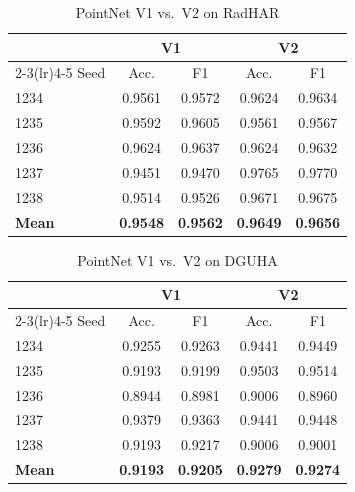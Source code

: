 \documentclass[10pt,twocolumn]{article}
\begin{document}
\begin{table}[H]
\centering
\scriptsize
\setlength{\tabcolsep}{3pt}
\begin{tabular}{lcccc}
\toprule
 & \multicolumn{2}{c}{V1} & \multicolumn{2}{c}{V2} \\
\cmidrule(lr){2-3}\cmidrule(lr){4-5}
Seed & Acc. & F1 & Acc. & F1 \\
\midrule
1234 & 0.9561 & 0.9572 & 0.9624 & 0.9634 \\
1235 & 0.9592 & 0.9605 & 0.9561 & 0.9567 \\
1236 & 0.9624 & 0.9637 & 0.9624 & 0.9632 \\
1237 & 0.9451 & 0.9470 & 0.9765 & 0.9770 \\
1238 & 0.9514 & 0.9526 & 0.9671 & 0.9675 \\
\midrule
\textbf{Mean} & \textbf{0.9548} & \textbf{0.9562} & \textbf{0.9649} & \textbf{0.9656} \\
\bottomrule
\end{tabular}
\caption{PointNet V1 vs.\ V2 on RadHAR}
\label{tab:pointnet-radhar}
\end{table}

\begin{table}[H]
\centering
\scriptsize
\setlength{\tabcolsep}{3pt}
\begin{tabular}{lcccc}
\toprule
 & \multicolumn{2}{c}{V1} & \multicolumn{2}{c}{V2} \\
\cmidrule(lr){2-3}\cmidrule(lr){4-5}
Seed & Acc. & F1 & Acc. & F1 \\
\midrule
1234 & 0.9255 & 0.9263 & 0.9441 & 0.9449 \\
1235 & 0.9193 & 0.9199 & 0.9503 & 0.9514 \\
1236 & 0.8944 & 0.8981 & 0.9006 & 0.8960 \\
1237 & 0.9379 & 0.9363 & 0.9441 & 0.9448 \\
1238 & 0.9193 & 0.9217 & 0.9006 & 0.9001 \\
\midrule
\textbf{Mean} & \textbf{0.9193} & \textbf{0.9205} & \textbf{0.9279} & \textbf{0.9274} \\
\bottomrule
\end{tabular}
\caption{PointNet V1 vs.\ V2 on DGUHA}
\label{tab:pointnet-dguha}
\end{table}
\end{document}
